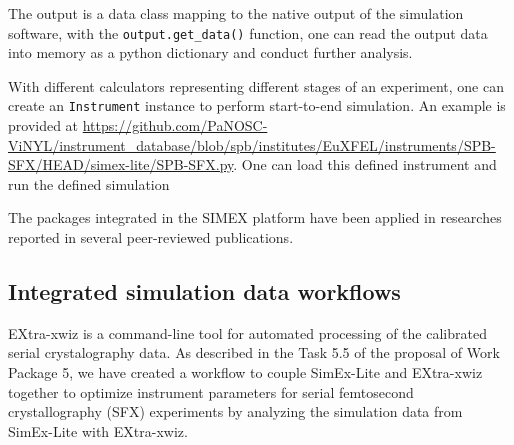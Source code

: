 \documentclass[11pt, a4paper]{article}
\begin{document}
The output is a data class mapping to the native output of the simulation software, with the \verb|output.get_data()| function, one can read the output data into memory as a python dictionary and conduct further analysis.

With different calculators representing different stages of an experiment, one can create an \verb|Instrument| instance to perform start-to-end simulation. An example is provided at
\url{https://github.com/PaNOSC-ViNYL/instrument_database/blob/spb/institutes/EuXFEL/instruments/SPB-SFX/HEAD/simex-lite/SPB-SFX.py}. One can load this defined instrument and run the defined simulation 

The packages integrated in the SIMEX platform have been applied in researches reported in several peer-reviewed publications\cite{fortmann-grote2017iucrj,e2021,e2022}.




\subsection{Integrated simulation data workflows}
EXtra-xwiz is a command-line tool for automated processing of the calibrated serial crystalography data. \cite{xwiz} As described in the Task 5.5 of the proposal of Work Package 5, we have created a workflow to couple SimEx-Lite and EXtra-xwiz together to optimize instrument parameters for serial femtosecond crystallography (SFX) experiments by analyzing the simulation data from SimEx-Lite with EXtra-xwiz. 
\end{document}
